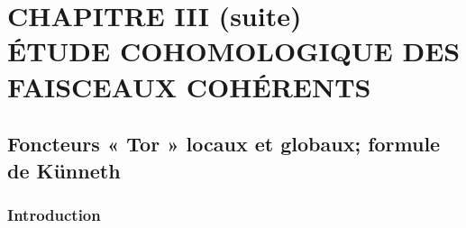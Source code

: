 \chapter*{CHAPITRE III (suite)\\[1.2ex]
\Large ÉTUDE COHOMOLOGIQUE DES FAISCEAUX COHÉRENTS}

\section{Foncteurs « Tor » locaux et globaux; formule de Künneth}
\label{section:III.6.fr}

\subsection{Introduction}
\label{subsection:III.6.1.fr}


